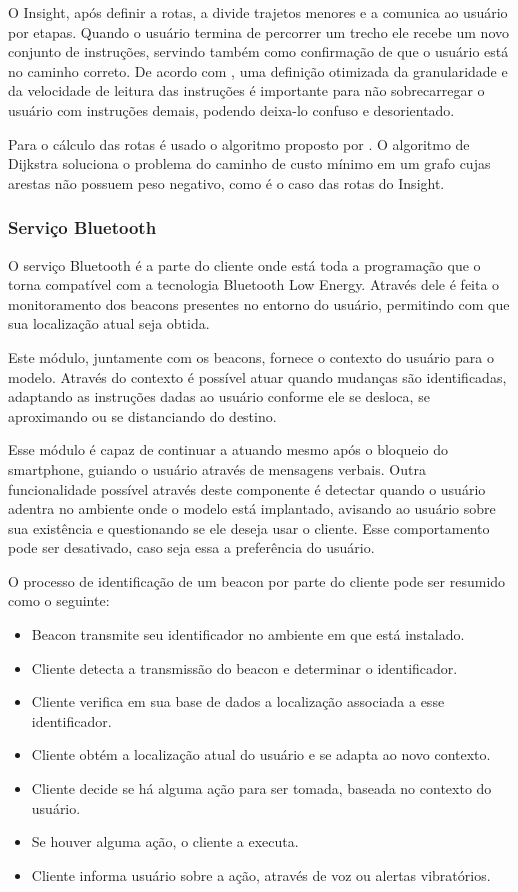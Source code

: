 \documentclass[english,brazilian]{UNISINOSmonografia}
\begin{document}
O Insight, após definir a rotas, a divide trajetos menores e a comunica ao usuário por etapas. Quando o usuário termina de percorrer um trecho ele recebe um novo conjunto de instruções, servindo também como confirmação de que o usuário está no caminho correto. De acordo com , uma definição otimizada da granularidade e da velocidade de leitura das instruções é importante para não sobrecarregar o usuário com instruções demais, podendo deixa-lo confuso e desorientado. 

Para o cálculo das rotas é usado o algoritmo proposto por . O algoritmo de Dijkstra soluciona o problema do caminho de custo mínimo em um grafo cujas arestas não possuem peso negativo, como é o caso das rotas do Insight.

	\subsubsection{Serviço Bluetooth}
O serviço Bluetooth é a parte do cliente onde está toda a programação que o torna compatível com a tecnologia Bluetooth Low Energy. Através dele é feita o monitoramento dos beacons presentes no entorno do usuário, permitindo com que sua localização atual seja obtida.

Este módulo, juntamente com os beacons, fornece o contexto do usuário para o modelo. Através do contexto é possível atuar quando mudanças são identificadas, adaptando as instruções dadas ao usuário conforme ele se desloca, se aproximando ou se distanciando do destino.

Esse módulo é capaz de continuar a atuando mesmo após o bloqueio do smartphone, guiando o usuário através de mensagens verbais. Outra funcionalidade possível através deste componente é detectar quando o usuário adentra no ambiente onde o modelo está implantado, avisando ao usuário sobre sua existência e questionando se ele deseja usar o cliente. Esse comportamento pode ser desativado, caso seja essa a preferência do usuário.

O processo de identificação de um beacon por parte do cliente pode ser resumido como o seguinte:
\begin{itemize}
	\item Beacon transmite seu identificador no ambiente em que está instalado. 
	\item Cliente detecta a transmissão do beacon e determinar o identificador.
	\item Cliente verifica em sua base de dados a localização associada a esse identificador.
	\item Cliente obtém a localização atual do usuário e se adapta ao novo contexto.
	\item Cliente decide se há alguma ação para ser tomada, baseada no contexto do usuário.
	\item Se houver alguma ação, o cliente a executa.
	\item Cliente informa usuário sobre a ação, através de voz ou alertas vibratórios.
\end{itemize}
\end{document}
